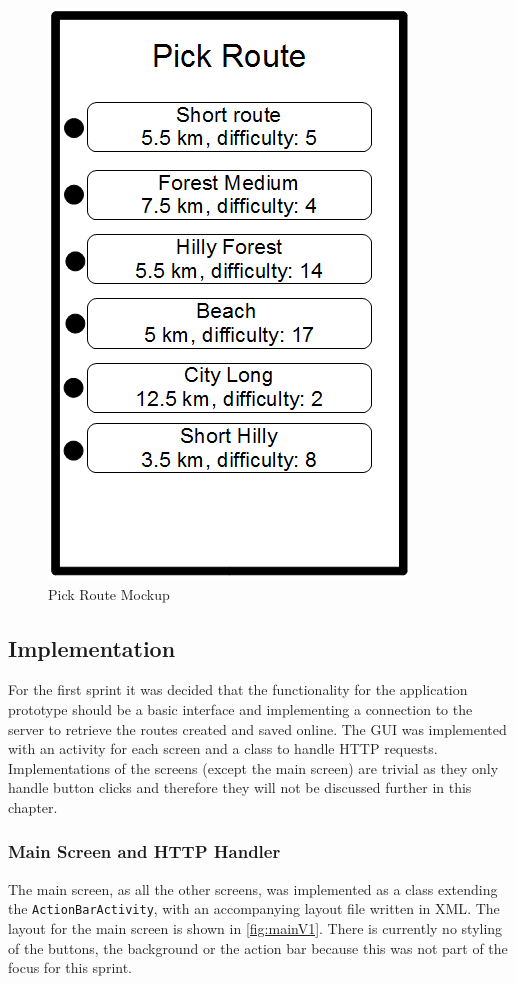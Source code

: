 \begin{figure}[!ht]
	\begin{center}
		\includegraphics[scale=0.4]{img/pickRouteMock.png}
		\caption{Pick Route Mockup}
		\label{fig:pickRouteMock}
	\end{center}
\end{figure}

\subsection{Implementation}
For the first sprint it was decided that the functionality for the application prototype should be a basic interface and implementing a connection to the server to retrieve the routes created and saved online. The \ac{GUI} was implemented with an activity for each screen and a class to handle \ac{HTTP} requests. Implementations of the screens (except the main screen) are trivial as they only handle button clicks and therefore they will not be discussed further in this chapter.

\subsubsection{Main Screen and HTTP Handler}
The main screen, as all the other screens, was implemented as a class extending the \texttt{ActionBarActivity}, with an accompanying layout file written in \ac{XML}. The layout for the main screen is shown in \autoref{fig:mainV1}. There is currently no styling of the buttons, the background or the action bar because this was not part of the focus for this sprint. 

